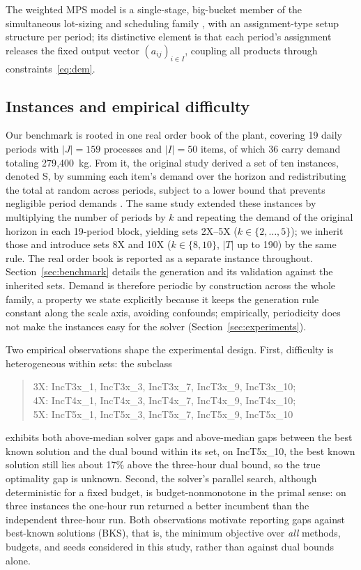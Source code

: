 

The weighted MPS model is a single-stage, big-bucket member of the simultaneous
lot-sizing and scheduling family \citep{copil2017simultaneous}, with
an assignment-type setup structure per period; its distinctive
element is that each period's assignment releases the fixed output
vector $(a_{ij})_{i\in I}$, coupling all products through
constraints~\eqref{eq:dem}.

\subsection{Instances and empirical difficulty}
\label{sec:difficulty}

Our benchmark is rooted in one real order book of the plant, covering
19 daily periods with $|J|=159$ processes and $|I|=50$ items, of which
36 carry demand totaling 279{,}400~kg. From it, the original study
derived a set of ten instances, denoted S, by summing each item's
demand over the horizon and redistributing the total at random across
periods, subject to a lower bound that prevents negligible period
demands \citep[Section~4.3]{luche2009combining}. The same study
extended these instances by multiplying the number of periods by $k$
and repeating the demand of the original horizon in each 19-period
block, yielding sets 2X--5X ($k\in\{2,\dots,5\}$); we inherit those
and introduce sets 8X and 10X ($k\in\{8,10\}$, $|T|$ up to 190) by the
same rule. The real order book is reported as a separate instance
throughout. Section~\ref{sec:benchmark}
details the generation and its validation against the inherited
sets. Demand is therefore periodic by construction across the whole
family, a property we state explicitly because it keeps the
generation rule constant along the scale axis, avoiding confounds;
empirically, periodicity does not make the instances easy for the
solver (Section~\ref{sec:experiments}).

Two empirical observations shape the experimental design. First,
difficulty is heterogeneous within sets: the subclass
%
\begin{quote}\footnotesize
3X: IncT3x\_1, IncT3x\_3, IncT3x\_7, IncT3x\_9, IncT3x\_10;\\
4X: IncT4x\_1, IncT4x\_3, IncT4x\_7, IncT4x\_9, IncT4x\_10;\\
5X: IncT5x\_1, IncT5x\_3, IncT5x\_7, IncT5x\_9, IncT5x\_10
\end{quote}
%
exhibits both above-median solver gaps and above-median gaps between
the best known solution and the dual bound
within its set, on
IncT5x\_10, the best known solution still lies about 17\% above the
three-hour dual bound, so the true optimality gap is unknown.
Second, the solver's parallel search, although deterministic for a
fixed budget, is budget-nonmonotone in the primal sense: on three
instances the one-hour run returned a better incumbent than the
independent three-hour run. Both observations motivate reporting
gaps against best-known solutions (BKS), that is, the minimum
objective over \emph{all} methods, budgets, and seeds considered in
this study, rather than against dual bounds alone.
